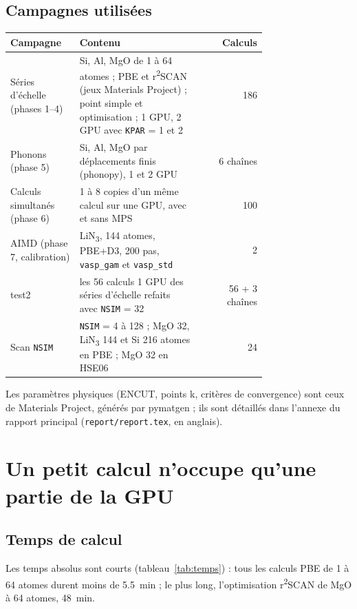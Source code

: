 \documentclass[11pt,a4paper]{article}
\newcommand{\rscan}{r\textsuperscript{2}SCAN}
\begin{document}
\subsection{Campagnes utilisées}

\begin{center}
\small
\begin{tabular}{@{}p{0.27\linewidth}p{0.47\linewidth}r@{}}
\toprule
Campagne & Contenu & Calculs \\
\midrule
Séries d'échelle (phases 1--4) & Si, Al, MgO de 1 à 64 atomes ; PBE et \rscan{} (jeux Materials Project) ;
point simple et optimisation ; 1 GPU, 2 GPU avec \texttt{KPAR} = 1 et 2 & 186 \\
Phonons (phase 5) & Si, Al, MgO par déplacements finis (phonopy), 1 et 2 GPU & 6 chaînes \\
Calculs simultanés (phase 6) & 1 à 8 copies d'un même calcul sur une GPU, avec et sans MPS & 100 \\
AIMD (phase 7, calibration) & LiN\textsubscript{3}, 144 atomes, PBE+D3, 200 pas, \texttt{vasp\_gam} et \texttt{vasp\_std} & 2 \\
test2 & les 56 calculs 1 GPU des séries d'échelle refaits avec \texttt{NSIM} = 32 & 56 + 3 chaînes \\
Scan \texttt{NSIM} & \texttt{NSIM} = 4 à 128 ; MgO 32, LiN\textsubscript{3} 144 et Si 216 atomes en PBE ; MgO 32 en HSE06 & 24 \\
\bottomrule
\end{tabular}
\end{center}

Les paramètres physiques (ENCUT, points k, critères de convergence) sont ceux de Materials
Project, générés par pymatgen ; ils sont détaillés dans l'annexe du rapport principal
(\texttt{report/report.tex}, en anglais).

\section{Un petit calcul n'occupe qu'une partie de la GPU}
\label{sec:sousutilisation}

\subsection{Temps de calcul}

Les temps absolus sont courts (tableau~\ref{tab:temps}) : tous les calculs PBE de 1 à
64 atomes durent moins de \SI{5,5}{min} ; le plus long, l'optimisation \rscan{} de MgO
à 64 atomes, \SI{48}{min}.
\end{document}

